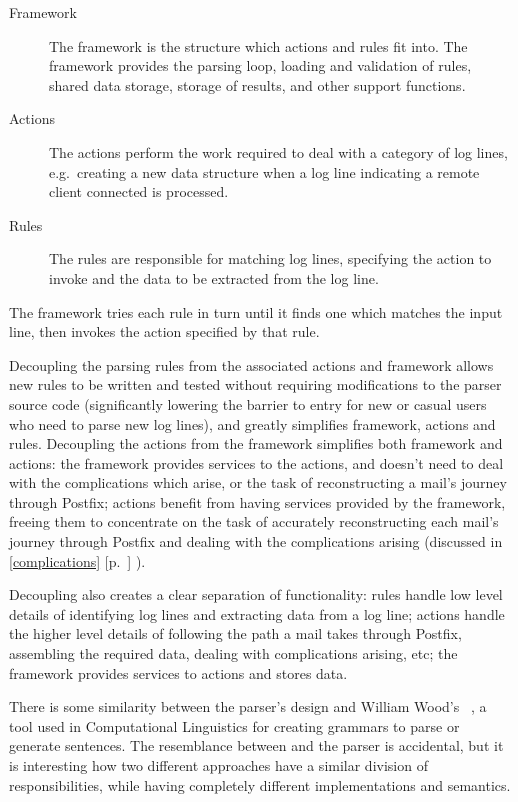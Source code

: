 \documentclass[draft]{svmult}
\newcommand{\refwithpage}[1]{%
    \empty{}\ref{#1} [p.~\pageref{#1}]%
}
\newcommand{\sectionref}[1]{%
    \textsection{}\refwithpage{#1}%
}
\begin{document}
\begin{description}

    \item [Framework]  The framework is the structure which actions and
        rules fit into.  The framework provides the parsing loop, loading
        and validation of rules, shared data storage, storage of results,
        and other support functions.

    \item [Actions]  The actions perform the work required to deal with a
        category of log lines, e.g.\ creating a new data structure when a
        log line indicating a remote client connected is processed.

    \item [Rules]  The rules are responsible for matching log lines,
        specifying the action to invoke and the data to be extracted from
        the log line.

\end{description}

The framework tries each rule in turn until it finds one which matches the
input line, then invokes the action specified by that rule.

Decoupling the parsing rules from the associated actions and framework allows
new rules to be written and tested without requiring modifications to the
parser source code (significantly lowering the barrier to entry for new or
casual users who need to parse new log lines), and greatly simplifies
framework, actions and rules. Decoupling the actions from the
framework simplifies both framework and actions: the framework provides
services to the actions, and doesn't need to deal with the complications which
arise, or the task of reconstructing a mail's journey through Postfix; actions
benefit from having services provided by the framework, freeing them to
concentrate on the task of accurately reconstructing each mail's journey
through Postfix and dealing with the complications arising (discussed in
\sectionref{complications}).

Decoupling also creates a clear separation of functionality: rules handle low
level details of identifying log lines and extracting data from a log line;
actions handle the higher level details of following the path a mail takes
through Postfix, assembling the required data, dealing with complications
arising, etc; the framework provides services to actions and stores data.  

There is some similarity between the parser's design and William Wood's
\ATN{}~\cite{atns, nlpip}, a tool used in Computational Linguistics for
creating grammars to parse or generate sentences.  The resemblance between
\ATN{} and the parser is accidental, but it is interesting how two
different approaches have a similar division of responsibilities, while
having completely different implementations and semantics.
\end{document}
